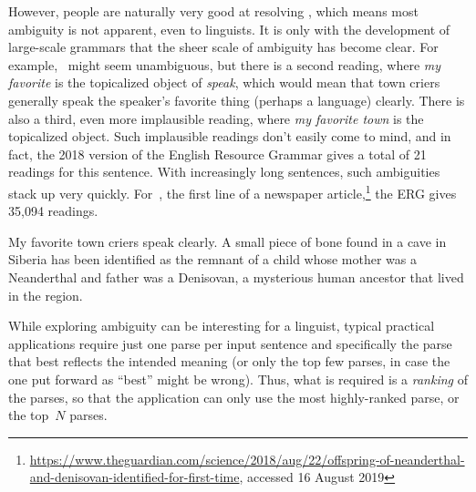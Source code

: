 \documentclass[output=paper,nonflat]{langsci/langscibook}
\begin{document}
However, people are naturally very good at resolving ,
which means most ambiguity is not apparent, even to linguists.
It is only with the development of large-scale grammars that the sheer scale of ambiguity has become clear.
For example, ~might seem unambiguous,
but there is a second reading, where \textit{my favorite} is the topicalized object of \textit{speak},
which would mean that town criers generally speak the speaker's favorite thing (perhaps a language) clearly.
There is also a third, even more implausible reading, where \textit{my favorite town} is the topicalized object.
Such implausible readings don't easily come to mind,
and in fact, the 2018 version of the English Resource Grammar \citep[ERG;][]{Flickinger2000a,Flickinger2011a-u}
gives a total of 21 readings for this sentence.
With increasingly long sentences, such ambiguities stack up very quickly.
For~, the first line of a newspaper article,\footnote{%
	\url{https://www.theguardian.com/science/2018/aug/22/offspring-of-neanderthal-and-denisovan-identified-for-first-time}, accessed 16 August 2019}
the ERG gives 35,094 readings.

\begin{exe}
\ex\label{cl:ex:ambig-simple}
My favorite town criers speak clearly.
\ex\label{cl:ex:ambig-many}
A small piece of bone found in a cave in Siberia has been identified
as the remnant of a child whose mother was a Neanderthal and father was a Denisovan,
a mysterious human ancestor that lived in the region.
\end{exe}

While exploring ambiguity can be interesting for a linguist,
typical practical applications require just one parse per input sentence
and specifically the parse that best reflects the intended meaning
(or only the top few parses, in case the one put forward as ``best'' might be wrong).
Thus, what is required is a \textit{ranking} of the parses,
so that the application can only use the most highly-ranked parse,
or the top~$N$ parses.
\end{document}
